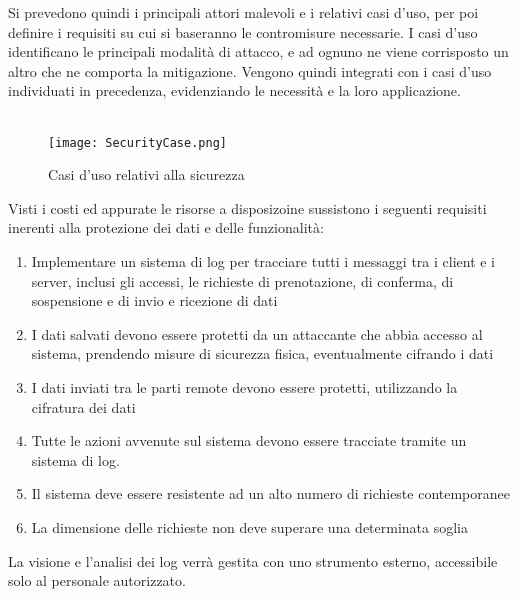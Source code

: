 \clearpage
Si prevedono quindi i principali attori malevoli e i relativi casi d'uso, 
per poi definire i requisiti su cui si baseranno le contromisure necessarie. 
I casi d'uso identificano le principali modalità di attacco, 
e ad ognuno ne viene corrisposto un altro che ne comporta la mitigazione. 
Vengono quindi integrati con i casi d'uso individuati in precedenza, 
evidenziando le necessità e la loro applicazione.\\
\\
\begin{figure}[h!]
    \begin{center}
        \texttt{[image: SecurityCase.png]}
        \caption{Casi d'uso relativi alla sicurezza}
    \end{center}

\end{figure}
\clearpage

Visti i costi ed appurate le risorse a disposizoine sussistono i seguenti requisiti 
inerenti alla protezione dei dati e delle funzionalità:
\begin{enumerate}
    \item Implementare un sistema di log per tracciare tutti i messaggi tra i client e i server, inclusi gli accessi, le richieste di prenotazione, di conferma, di sospensione e di invio e ricezione di dati
    \item I dati salvati devono essere protetti da un attaccante che abbia accesso al sistema, prendendo misure di sicurezza fisica, eventualmente cifrando i dati
    \item I dati inviati tra le parti remote devono essere protetti, utilizzando la cifratura dei dati
    \item Tutte le azioni avvenute sul sistema devono essere tracciate tramite un sistema di log.
    \item Il sistema deve essere resistente ad un alto numero di richieste contemporanee
    \item La dimensione delle richieste non deve superare una determinata soglia
\end{enumerate}

La visione e l'analisi dei log verrà gestita con uno strumento esterno, accessibile solo al personale autorizzato.


